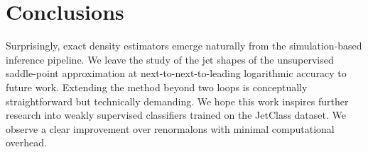 \section{Conclusions}\label{sec:conclusions}

Surprisingly, exact density estimators emerge naturally from the
simulation-based inference pipeline. We leave the study of the jet
shapes of the unsupervised saddle-point approximation at
next-to-next-to-leading logarithmic accuracy to future work. Extending
the method beyond two loops is conceptually straightforward but
technically demanding. We hope this work inspires further research into
weakly supervised classifiers trained on the JetClass dataset. We
observe a clear improvement over renormalons with minimal computational
overhead.


